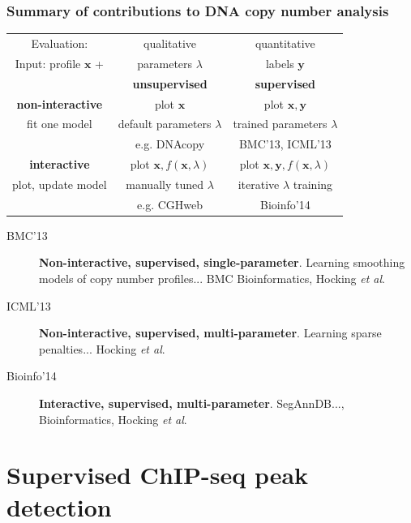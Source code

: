 \documentclass{beamer}
\begin{document}
\begin{frame}
  \frametitle{Summary of contributions to
    DNA copy number analysis}
  \begin{center}
  \begin{tabular}{c|c|c}
    Evaluation: & qualitative &  quantitative \\
    Input: profile $\mathbf x$ + & parameters $\lambda$ & labels $\mathbf y$ \\
        & \textbf{unsupervised} & \textbf{supervised}\\
    \hline
    \textbf{non-interactive}
    & plot $\mathbf x$ & plot $\mathbf x, \mathbf y$\\
    fit one model
    & default parameters $\lambda$ & trained parameters $\lambda$ \\
    & e.g. DNAcopy & BMC'13, ICML'13\\
    \hline
    \textbf{interactive}
    & plot $\mathbf x, f(\mathbf x, \lambda)$ 
    & plot $\mathbf x, \mathbf y, f(\mathbf x, \lambda)$\\
    plot, update model 
    & manually tuned $\lambda$ & iterative $\lambda$ training\\
    & e.g. CGHweb  & Bioinfo'14
  \end{tabular}
  \end{center}
  \begin{description}
  \item[BMC'13] \textbf{Non-interactive, supervised, single-parameter}.
    Learning smoothing models of copy number profiles... 
    BMC Bioinformatics, Hocking \textit{et al}.
  \item[ICML'13] \textbf{Non-interactive, supervised,
      multi-parameter}.  
    Learning sparse penalties... Hocking \textit{et al}.
  \item[Bioinfo'14] \textbf{Interactive, supervised, multi-parameter}.
    SegAnnDB..., Bioinformatics, Hocking \textit{et al}.
  \end{description}
\end{frame}

\section{Supervised ChIP-seq peak detection}
\end{document}

